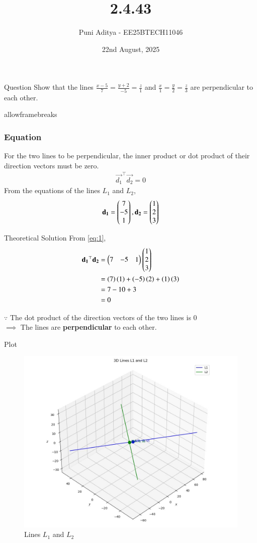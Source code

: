 \documentclass{beamer}
\title{2.4.43}
\date{22nd August, 2025}
\author{Puni Aditya - EE25BTECH11046}
\begin{document}
\frame{\titlepage}
\begin{frame}{Question}
Show that the lines $\frac{x-5}{7}=\frac{y+2}{-5}=\frac{z}{1}$ and $\frac{x}{1}=\frac{y}{2}=\frac{z}{3}$ are perpendicular to each other.
\end{frame}

\begin{frame}{allowframebreaks}
\frametitle{Equation}
For the two lines to be perpendicular, the inner product or dot product of their direction vectors must be zero.
\begin{align}
    \vec{d_1}^\top \vec{d_2} = 0 \label{eq:1}
\end{align}
From the equations of the lines $L_1$ and $L_2$,
\begin{align}
    \mathbf{d_1} = \begin{pmatrix}7 \\ -5 \\ 1\end{pmatrix}, 
    \mathbf{d_2} = \begin{pmatrix}1 \\ 2 \\ 3\end{pmatrix}
\end{align}
\end{frame}

\begin{frame}{Theoretical Solution}
From \ref{eq:1},
\begin{align}
    \mathbf{d_1}^\top \mathbf{d_2} &= \begin{pmatrix}7&-5&1\end{pmatrix}\begin{pmatrix}1 \\ 2 \\ 3\end{pmatrix} \\
    &= \left(7\right)\left(1\right) + \left(-5\right)\left(2\right) + \left(1\right)\left(3\right) \\
    &= 7 - 10 + 3 \\
    &= 0
\end{align}

$\because$ The dot product of the direction vectors of the two lines is 0 \\
$\implies$ The lines are \textbf{perpendicular} to each other.
\end{frame}

\begin{frame}{Plot}
    \begin{figure}
    \centering
    \includegraphics[width=0.5\columnwidth]{../figs/plot_c.jpg}
    \caption{Lines $L_1$ and $L_2$}
    \label{fig:fig}
\end{figure}
\end{frame}
\end{document}
